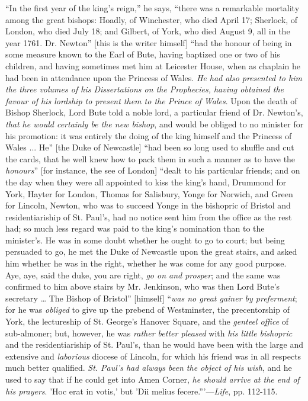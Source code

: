 ``In the first year of the king's reign,'' he says,
``there was a remarkable mortality among the great bishops: Hoadly,
of Winchester, who died April 17; Sherlock, of London, who died July
18; and Gilbert, of York, who died August 9, all in the year 1761. Dr.
Newton'' [this is the writer himself] ``had the honour of
being in some measure known to the Earl of Bute, having baptized one
or two of his children, and having sometimes met him at Leicester
House, when as chaplain he had been in attendance upon the Princess of
Wales. \emph{He had also presented to him the three volumes of his
Dissertations on the Prophecies, having obtained the favour of his
lordship to present them to the Prince of Wales}. Upon the death of
Bishop Sherlock, Lord Bute told a noble lord, a particular friend of
Dr. Newton's, \emph{that he would certainly be the new bishop}, and would be
obliged to no minister for his promotion: it was entirely the doing of
the king himself and the Princess of Wales ... He'' [the Duke of
Newcastle] ``had been so long used to shuffle and cut the cards,
that he well knew how to pack them in such a manner as to have the \emph{honours}''
[for instance, the see of London] ``dealt to his particular
friends; and on the day when they were all appointed to kiss the king's
hand, Drummond for York, Hayter for London, Thomas for Salisbury,
Yonge for Norwich, and Green for Lincoln,
Newton, who was to succeed Yonge in the bishopric of Bristol and
residentiariship of St. Paul's, had no notice sent him from the office
as the rest had; so much less regard was paid to the king's nomination
than to the minister's. He was in some doubt whether he ought to go to
court; but being persuaded to go, he met the Duke of Newcastle upon
the great stairs, and asked him whether he was in the right, whether
he was come for any good purpose. Aye, aye, said the duke, you are
right, \emph{go on and prosper}; and the same was confirmed to him
above stairs by Mr. Jenkinson, who was then Lord Bute's secretary …
The Bishop of Bristol'' [himself] ``\emph{was no great gainer by
preferment}; for he was \emph{obliged} to give up the prebend of
Westminster, the precentorship of York, the lectureship of St. George's
Hanover Square, and the \emph{genteel office} of sub-almoner; but,
however, he was \emph{rather better pleased} with \emph{his little
bishopric} and the residentiariship of St. Paul's, than he would
have been with the large and extensive and \emph{laborious} diocese of
Lincoln, for which his friend was in all respects much better
qualified. \emph{St. Paul's had always been the object of his wish},
and he used to say that if he could get into Amen Corner, \emph{he should
arrive at the end of his prayers}. 'Hoc erat in votis,' but 'Dii
melius fecere.'''—\emph{Life}, pp. 112-115.

